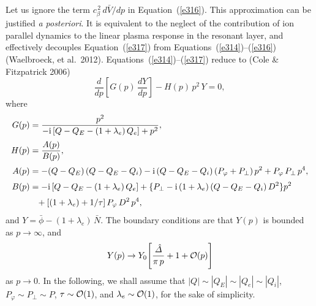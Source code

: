 \documentclass[notitlepage,12pt]{article}
\begin{document}
Let us ignore the term $c_\beta^{\,2}\,d\bar{V}/dp$ in Equation~(\ref{e316}). This approximation can
be justified {\em a posteriori}. It is equivalent to the neglect of the contribution of ion parallel dynamics to the linear  plasma
response in the resonant layer, and effectively decouples Equation~(\ref{e317}) from Equations~(\ref{e314})--(\ref{e316}) (Waelbroeck, et al.\ 2012). Equations~(\ref{e314})--(\ref{e317}) reduce to (Cole \& Fitzpatrick 2006)
\begin{equation}\label{e320}
\frac{d}{dp}\!\left[G(p)\,\frac{dY}{dp}\right] - H(p)\,p^{2}\,Y = 0,
\end{equation}
where
\begin{align}
G(p)&= \frac{p^2}{-{\rm i}\,[Q-Q_E-(1+\lambda_e)\,Q_e] + p^2},\\[0.5ex]
H(p) &=\frac{A(p)}{B(p)},\\[0.5ex]
 A(p) &= -(Q-Q_E)\,(Q-Q_E-Q_i)-{\rm i}\,(Q-Q_E-Q_i)\,(P_\varphi+P_\perp)\,p^2 + P_\varphi\,P_\perp\,p^4,\\[0.5ex]
 B(p) &= 
-{\rm i}\,[Q-Q_E-(1+\lambda_e)\,Q_e] +\{P_\perp - {\rm i}\,(1+\lambda_e)\,(Q-Q_E-Q_i)\,D^2\}p^2\nonumber\\[0.5ex]
&\phantom{=}+[(1+\lambda_e)+1/\tau]\,P_\varphi\,D^2\,p^4,
\end{align}
and $Y=\bar{\phi} - (1+\lambda_e)\,\bar{N}$. The boundary conditions are that $Y(p)$ is bounded as $p\rightarrow\infty$, and
\begin{equation}\label{e325}
Y(p)\rightarrow Y_0\!\left[\frac{\hat{\mit\Delta}}{\pi\,p} + 1+ {\cal O}(p)\right]
\end{equation}
as $p\rightarrow 0$. In the following, we shall assume that $|Q|\sim |Q_E|\sim |Q_e|\sim |Q_i|$, $P_\varphi\sim P_\perp \sim P$, $\tau\sim {\cal O}(1)$, and $\lambda_e\sim{\cal O}(1)$,  for the
sake of simplicity. 
\end{document}
